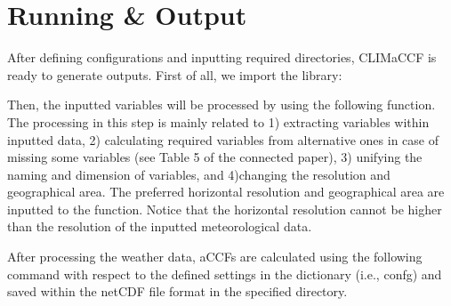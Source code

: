 \documentclass[a4paper,11pt,english]{sphinxmanual}
\begin{document}
\begin{sphinxVerbatim}[commandchars=\\\{\}]
      
\end{sphinxVerbatim}


\section{Running \& Output}
\label{\detokenize{gStarted:running-output}}
After defining configurations and inputting required directories, CLIMaCCF is ready to generate outputs. First of all, we import the library:

\begin{sphinxVerbatim}[commandchars=\\\{\}]
 
   
\end{sphinxVerbatim}

Then, the inputted variables will be processed by using the following function. The processing in this step is mainly related to 1) extracting variables within inputted data, 2) calculating required variables from alternative ones in case of missing some variables (see Table 5 of the connected paper), 3) unifying the naming and dimension of variables, and 4)changing the resolution and geographical area.
The preferred horizontal resolution and geographical area are inputted to the function. Notice that the horizontal resolution cannot be higher than the resolution of the inputted meteorological data.

\begin{sphinxVerbatim}[commandchars=\\\{\}]
        
\end{sphinxVerbatim}

After processing the weather data, aCCFs are calculated using the following command with respect to the defined settings in the dictionary (i.e., confg) and saved within the netCDF file format in the specified directory.
\end{document}
